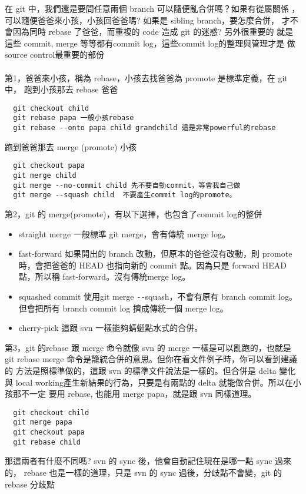   在 git 中，我們還是要問任意兩個 branch 可以隨便亂合併嗎？如果有從屬關係
  ，可以隨便爸爸來小孩，小孩回爸爸嗎? 如果是 sibling branch，要怎麼合併，
  才不會因為同時 rebase 了爸爸，而重複的 code 造成 git 的迷惑? 另外很重要的
  就是這些 commit, merge 等等都有commit log，這些commit log的整理與管理才是
  做source control最重要的部份
  \\\\
  第1，爸爸來小孩，稱為 rebase，小孩去找爸爸為 promote 是標準定義，在 git 中，
  跑到小孩那去 rebase 爸爸
  \begin{verbatim}
  git checkout child
  git rebase papa 一般小孩rebase
  git rebase --onto papa child grandchild 這是非常powerful的rebase
  \end{verbatim}
  跑到爸爸那去 merge (promote) 小孩
  \begin{verbatim}
  git checkout papa
  git merge child
  git merge --no-commit child 先不要自動commit，等會我自己做
  git merge --squash child  不要產生commit log的promote。
  \end{verbatim}
  第2，git 的 merge(promote)，有以下選擇，也包含了commit log的整併
  \begin{itemize}
    \item straight merge 一般標準 git merge，會有傳統 merge log。
    \item fast-forward 如果開出的 branch 改動，但原本的爸爸沒有改動，則
      promote 時，會把爸爸的 HEAD 也指向新的 commit 點。因為只是
      forward HEAD點，所以稱 fast-forward。沒有傳統merge log。
    \item squashed commit 使用git merge \verb=--=squash，不會有原有
      branch commit log。 但會把所有 branch commit log 擠成傳統一個 merge log。
    \item cherry-pick 這跟 svn 一樣能夠蜻蜓點水式的合併。
  \end{itemize}
  第3，git 的rebase 跟 merge 命令就像 svn 的 merge 一樣是可以亂跑的，也就是
  git rebase merge 命令是籠統合併的意思。但你在看文件例子時，你可以看到建議的
  方法是照標準做的，這跟 svn 的標準文件說法是一樣的。但合併是 delta 變化與 local
  working產生新結果的行為，只要是有兩點的 delta 就能做合併。所以在小孩那不一定
  要用 rebase, 也能用 merge papa，就是跟 svn 同樣道理。
  \begin{verbatim}
  git checkout child
  git merge papa
  git checkout papa
  git rebase child
  \end{verbatim}
  那這兩者有什麼不同嗎? svn 的 sync 後，他會自動記住現在是哪一點 sync 過來的，
  rebase 也是一樣的道理，只是 svn 的 sync 過後，分歧點不會變，git 的 rebase 分歧點
